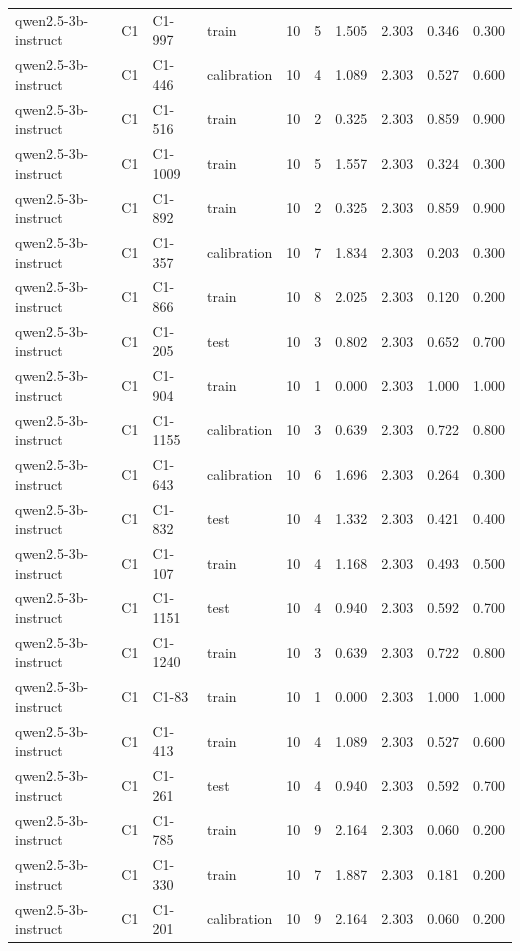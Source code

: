 \begin{table}
\begin{tabular}{llllrrrrrr}
qwen2.5-3b-instruct & C1 & C1-997 & train & 10 & 5 & 1.505 & 2.303 & 0.346 & 0.300 \\
qwen2.5-3b-instruct & C1 & C1-446 & calibration & 10 & 4 & 1.089 & 2.303 & 0.527 & 0.600 \\
qwen2.5-3b-instruct & C1 & C1-516 & train & 10 & 2 & 0.325 & 2.303 & 0.859 & 0.900 \\
qwen2.5-3b-instruct & C1 & C1-1009 & train & 10 & 5 & 1.557 & 2.303 & 0.324 & 0.300 \\
qwen2.5-3b-instruct & C1 & C1-892 & train & 10 & 2 & 0.325 & 2.303 & 0.859 & 0.900 \\
qwen2.5-3b-instruct & C1 & C1-357 & calibration & 10 & 7 & 1.834 & 2.303 & 0.203 & 0.300 \\
qwen2.5-3b-instruct & C1 & C1-866 & train & 10 & 8 & 2.025 & 2.303 & 0.120 & 0.200 \\
qwen2.5-3b-instruct & C1 & C1-205 & test & 10 & 3 & 0.802 & 2.303 & 0.652 & 0.700 \\
qwen2.5-3b-instruct & C1 & C1-904 & train & 10 & 1 & 0.000 & 2.303 & 1.000 & 1.000 \\
qwen2.5-3b-instruct & C1 & C1-1155 & calibration & 10 & 3 & 0.639 & 2.303 & 0.722 & 0.800 \\
qwen2.5-3b-instruct & C1 & C1-643 & calibration & 10 & 6 & 1.696 & 2.303 & 0.264 & 0.300 \\
qwen2.5-3b-instruct & C1 & C1-832 & test & 10 & 4 & 1.332 & 2.303 & 0.421 & 0.400 \\
qwen2.5-3b-instruct & C1 & C1-107 & train & 10 & 4 & 1.168 & 2.303 & 0.493 & 0.500 \\
qwen2.5-3b-instruct & C1 & C1-1151 & test & 10 & 4 & 0.940 & 2.303 & 0.592 & 0.700 \\
qwen2.5-3b-instruct & C1 & C1-1240 & train & 10 & 3 & 0.639 & 2.303 & 0.722 & 0.800 \\
qwen2.5-3b-instruct & C1 & C1-83 & train & 10 & 1 & 0.000 & 2.303 & 1.000 & 1.000 \\
qwen2.5-3b-instruct & C1 & C1-413 & train & 10 & 4 & 1.089 & 2.303 & 0.527 & 0.600 \\
qwen2.5-3b-instruct & C1 & C1-261 & test & 10 & 4 & 0.940 & 2.303 & 0.592 & 0.700 \\
qwen2.5-3b-instruct & C1 & C1-785 & train & 10 & 9 & 2.164 & 2.303 & 0.060 & 0.200 \\
qwen2.5-3b-instruct & C1 & C1-330 & train & 10 & 7 & 1.887 & 2.303 & 0.181 & 0.200 \\
qwen2.5-3b-instruct & C1 & C1-201 & calibration & 10 & 9 & 2.164 & 2.303 & 0.060 & 0.200 \\

\end{tabular}
\end{table}
